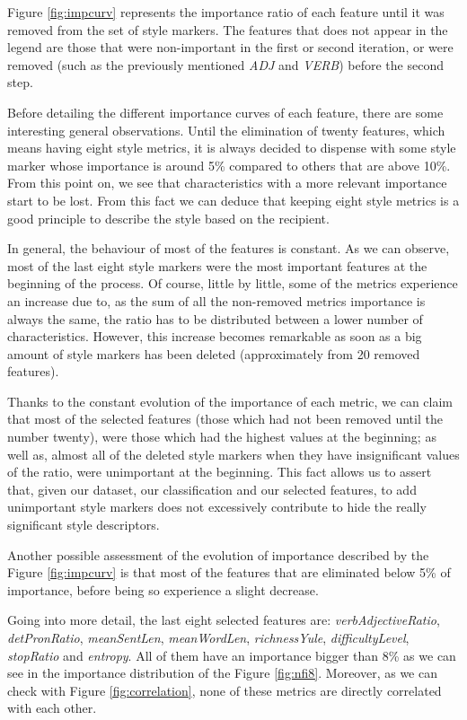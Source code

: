 Figure \ref{fig:impcurv} represents the importance ratio of each feature until it was removed from the set of style markers. The features that does not appear in the legend are those that were non-important in the first or second iteration, or were removed (such as the previously mentioned \textit{ADJ} and \textit{VERB}) before the second step.

Before detailing the different importance curves of each feature, there are some interesting general observations. Until the elimination of twenty features, which means having eight style metrics, it is always decided to dispense with some style marker whose importance is around 5\% compared to others that are above 10\%. From this point on, we see that characteristics with a more relevant importance start to be lost. From this fact we can deduce that keeping eight style metrics is a good principle to describe the style based on the recipient.

In general, the behaviour of most of the features is constant. As we can observe, most of the last eight style markers were the most important features at the beginning of the process. Of course, little by little, some of the metrics experience an increase due to, as the sum of all the non-removed metrics importance is always the same, the ratio has to be distributed between a lower number of characteristics. However, this increase becomes remarkable as soon as a big amount of style markers has been deleted (approximately from 20 removed features).

Thanks to the constant evolution of the importance of each metric, we can claim that most of the selected features (those which had not been removed until the number twenty), were those which had the highest values at the beginning; as well as, almost all of the deleted style markers when they have insignificant values of the ratio, were unimportant at the beginning. This fact allows us to assert that, given our dataset, our classification and our selected features, to add unimportant style markers does not excessively contribute to hide the really significant style descriptors.

Another possible assessment of the evolution of importance described by the Figure \ref{fig:impcurv} is that most of the features that are eliminated below 5\% of importance, before being so experience a slight decrease.

Going into more detail, the last eight selected features are: \textit{verbAdjectiveRatio}, \textit{detPronRatio}, \textit{meanSentLen}, \textit{meanWordLen}, \textit{richnessYule}, \textit{difficultyLevel}, \textit{stopRatio} and \textit{entropy}. All of them have an importance bigger than 8\% as we can see in the importance distribution of the Figure \ref{fig:nfi8}. Moreover, as we can check with Figure \ref{fig:correlation}, none of these metrics are directly correlated with each other.

